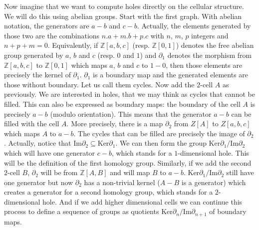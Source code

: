 Now imagine that we want to compute holes directly on the cellular structure. We will do this using abelian groups. Start with the first graph. With abelian notation, the generators are $a-b$ and $c-b$. Actually, the elements generated by those two are the combinations $n.a+m.b+p.c$ with $n$, $m$, $p$ integers and $n+p+m = 0$. Equivalently, if $\mathbb{Z}[a,b,c]$ (resp. $\mathbb{Z}[0,1]$) denotes the free abelian group generated by $a$, $b$ and $c$ (resp. $0$ and $1$) and $\partial_1$ denotes the morphism from $\mathbb{Z}[a,b,c]$ to $\mathbb{Z}[0,1]$ which maps $a$, $b$ and $c$ to $1 - 0$, then those elements are precisely the kernel of $\partial_1$. $\partial_1$ is a boundary map and the generated elements are those without boundary. Let us call them cycles. Now add the $2$-cell $A$ as previously. We are interested in holes, that we may think as cycles that cannot be filled. This can also be expressed as boundary maps: the boundary of the cell $A$ is precisely $a-b$ (modulo orientation). This means that the generator $a-b$ can be filled with the cell $A$. More precisely, there is a map $\partial_2$ from $Z[A]$ to $Z[a,b,c]$ which maps $A$ to $a-b$. The cycles that can be filled are precisely the image of $\partial_2$. Actually, notice that $\text{Im} \partial_2 \subseteq \text{Ker} \partial_1$. We can then form the group $\text{Ker} \partial_1 / \text{Im} \partial_2$ which will have one generator $c-b$, which stands for a $1$-dimensional hole. This will be the definition of the first homology group. Similarly, if we add the second $2$-cell $B$, $\partial_2$ will be from $\mathbb{Z}[A,B]$ and will map $B$ to $a-b$. $\text{Ker} \partial_1 / \text{Im} \partial_2$ still have one generator but now $\partial_2$ has a non-trivial kernel ($A-B$ is a generator) which creates a generator for a second homology group, which stands for a $2$-dimensional hole. And if we add higher dimensional cells we can continue this process to define a sequence of groups as quotients $\text{Ker} \partial_n/\text{Im} \partial_{n+1}$ of boundary maps.

